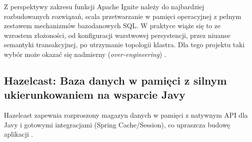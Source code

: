 Z perspektywy zakresu funkcji Apache Ignite należy do najbardziej rozbudowanych rozwiązań, scala przetwarzanie w pamięci operacyjnej z pełnym zestawem mechanizmów bazodanowych SQL. W praktyce wiąże się to ze wzrostem złożoności, od konfiguracji warstwowej persystencji, przez niuanse semantyki transakcyjnej, po utrzymanie topologii klastra. Dla tego projektu taki wybór może okazać się nadmierny (\emph{over-engineering}) \cite{ignite-docs}.

\subsection{Hazelcast: Baza danych w pamięci z silnym ukierunkowaniem na wsparcie Javy}

Hazelcast zapewnia rozproszony magazyn danych w pamięci z natywnym API dla Javy i gotowymi integracjami (Spring Cache/Session), co upraszcza budowę aplikacji \cite{hazelcast-docs}.

